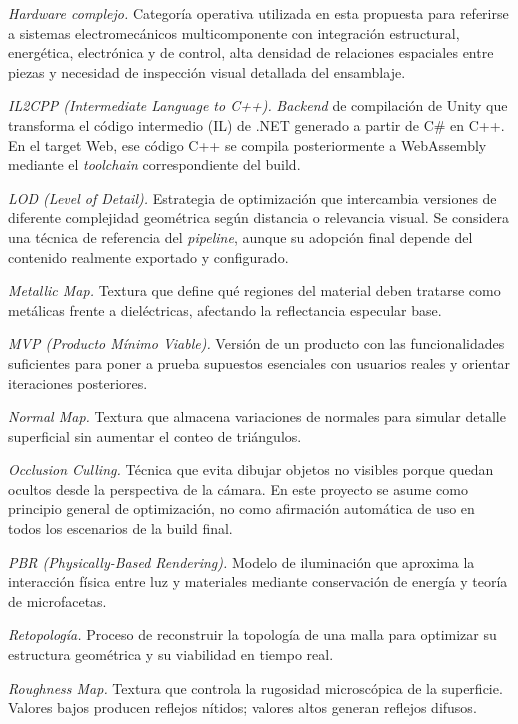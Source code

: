 \textit{Hardware complejo.} Categor\'ia operativa utilizada en esta propuesta para referirse a sistemas electromec\'anicos multicomponente con integraci\'on estructural, energ\'etica, electr\'onica y de control, alta densidad de relaciones espaciales entre piezas y necesidad de inspecci\'on visual detallada del ensamblaje.

\textit{IL2CPP (\textit{Intermediate Language to C++}).} \textit{Backend} de compilaci\'on de Unity que transforma el c\'odigo intermedio (IL) de .NET generado a partir de C\# en C++. En el target Web, ese c\'odigo C++ se compila posteriormente a WebAssembly mediante el \textit{toolchain} correspondiente del build.

\textit{LOD (\textit{Level of Detail}).} Estrategia de optimizaci\'on que intercambia versiones de diferente complejidad geom\'etrica seg\'un distancia o relevancia visual. Se considera una t\'ecnica de referencia del \textit{pipeline}, aunque su adopci\'on final depende del contenido realmente exportado y configurado.

\textit{Metallic Map.} Textura que define qu\'e regiones del material deben tratarse como met\'alicas frente a diel\'ectricas, afectando la reflectancia especular base.

\textit{MVP (Producto M\'inimo Viable).} Versi\'on de un producto con las funcionalidades suficientes para poner a prueba supuestos esenciales con usuarios reales y orientar iteraciones posteriores.

\textit{Normal Map.} Textura que almacena variaciones de normales para simular detalle superficial sin aumentar el conteo de tri\'angulos.

\textit{Occlusion Culling.} T\'ecnica que evita dibujar objetos no visibles porque quedan ocultos desde la perspectiva de la c\'amara. En este proyecto se asume como principio general de optimizaci\'on, no como afirmaci\'on autom\'atica de uso en todos los escenarios de la build final.

\textit{PBR (\textit{Physically-Based Rendering}).} Modelo de iluminaci\'on que aproxima la interacci\'on f\'isica entre luz y materiales mediante conservaci\'on de energ\'ia y teor\'ia de microfacetas.

\textit{Retopolog\'ia.} Proceso de reconstruir la topolog\'ia de una malla para optimizar su estructura geom\'etrica y su viabilidad en tiempo real.

\textit{Roughness Map.} Textura que controla la rugosidad microsc\'opica de la superficie. Valores bajos producen reflejos n\'itidos; valores altos generan reflejos difusos.

